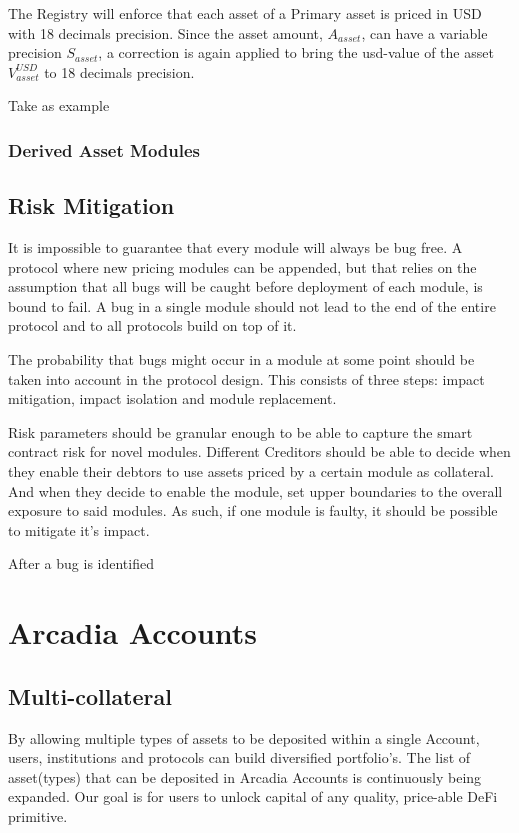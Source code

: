 \documentclass[sigconf,nonacm]{acmart}
\begin{document}
The Registry will enforce that each asset of a Primary asset is priced in USD with 18 decimals precision.
Since the asset amount, $A_{asset}$, can have a variable precision $S_{asset}$, a correction is again applied to bring the usd-value of the asset $V_{asset}^{USD}$ to 18 decimals precision.

Take as example 
\subsubsection{Derived Asset Modules}

\subsection{Risk Mitigation}
It is impossible to guarantee that every module will always be bug free.
A protocol where new pricing modules can be appended, but that relies on the assumption that all bugs will be caught before deployment of each module, is bound to fail.
A bug in a single module should not lead to the end of the entire protocol and to all protocols build on top of it.

The probability that bugs might occur in a module at some point should be taken into account in the protocol design.
This consists of three steps: impact mitigation, impact isolation and module replacement.

Risk parameters should be granular enough to be able to capture the smart contract risk for novel modules.
Different Creditors should be able to decide when they enable their debtors to use assets priced by a certain module as collateral.
And when they decide to enable the module, set upper boundaries to the overall exposure to said modules.
As such, if one module is faulty, it should be possible to mitigate it's impact.

After a bug is identified



\section{Arcadia Accounts}
\label{sec:arcadia-accounts}

\subsection{Multi-collateral}
By allowing multiple types of assets to be deposited within a single Account, users, institutions and protocols can build diversified portfolio's.
The list of asset(types) that can be deposited in Arcadia Accounts is continuously being expanded. Our goal is for users to unlock capital of any quality, price-able DeFi primitive.
\end{document}
